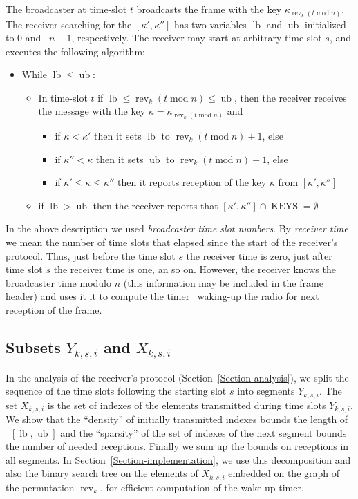 \documentclass{article}
\newcommand{\tmem}[1]{{\em #1\/}}
\newcommand{\tmop}[1]{\ensuremath{\operatorname{#1}}}
\begin{document}
The broadcaster at time-slot $t$ broadcasts the frame with the key
$\kappa_{\tmop{rev}_k (t \tmop{mod} n)}$. The receiver searching for the
$[\kappa', \kappa'']$ has two variables $\tmop{lb}$ and $\tmop{ub}$
initialized to $0$ and \ $n - 1$, respectively. The receiver may start at
arbitrary time slot $s$, and executes the following algorithm:
\begin{itemize}
\item While $\tmop{lb} \leq \tmop{ub}$:
\begin{itemize}
  \item In time-slot $t$ if $\tmop{lb} \leq \tmop{rev}_k (t \tmop{mod} n) \leq
  \tmop{ub}$, then the receiver receives the message with the key $\kappa =
  \kappa_{\tmop{rev}_k (t \tmop{mod} n)}$ and
  \begin{itemize}
    \item if $\kappa < \kappa'$ then it sets $\tmop{lb}$ to $\tmop{rev}_k (t
    \tmop{mod} n) + 1$, else
    
    \item if $\kappa'' < \kappa$ then it sets $\tmop{ub}$ to $\tmop{rev}_k (t
    \tmop{mod} n) - 1$, else
    
    \item if $\kappa' \leq \kappa\leq \kappa''$ then it reports reception of 
     the key $\kappa$ from $[\kappa', \kappa'']$
  \end{itemize}
  \item if $\tmop{lb} > \tmop{ub}$ then the receiver reports that $[\kappa',
  \kappa''] \cap \tmop{KEYS} = \emptyset$
\end{itemize}
\end{itemize}
In the above description we used {\tmem{broadcaster time slot numbers}}. By
{\tmem{receiver time}} we mean the number of time slots that elapsed since
the start of the receiver's protocol. Thus, just before the time slot $s$ the
receiver time is zero, just after time slot $s$ the receiver time is one, an
so on. However, the receiver knows the broadcaster time modulo $n$ (this
information may be included in the frame header) and uses it it to compute the
timer \ waking-up the radio for next reception of the frame.

\subsection{Subsets $Y_{k, s, i}$ and $X_{k, s, i}$}

In the analysis of the receiver's protocol (Section~\ref{Section-analysis}),
we split the sequence of the time slots following the starting slot $s$ into
segments $Y_{k, s, i}$. The set $X_{k, s, i}$ is the set of indexes of the
elements transmitted during time slots $Y_{k, s, i}$. We show that the
``density'' of initially transmitted indexes bounds the length of \
$[\tmop{lb}, \tmop{ub}]$ and the ``sparsity'' of the set of indexes of the
next segment bounds the number of needed receptions. Finally we sum up the
bounds on receptions in all segments. In Section~\ref{Section-implementation},
we use this decomposition and also the binary search tree on the elements of
$X_{k, s, i} $ embedded on the graph of the permutation $\tmop{rev}_k$, for
efficient computation of the wake-up timer.
\end{document}
